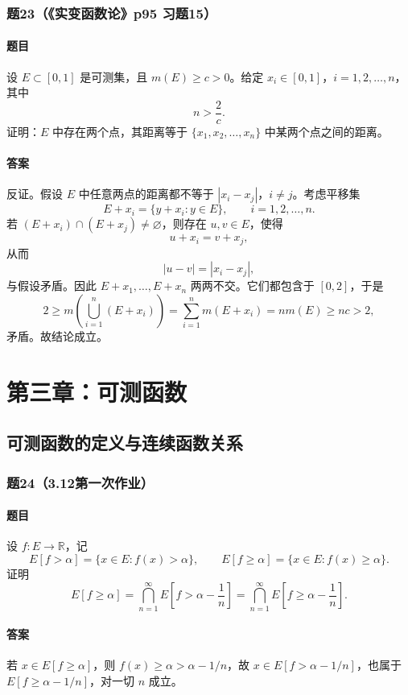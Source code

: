\documentclass{article}
\newcommand{\R}{\mathbb{R}}
\newcommand{\meas}{m}
\begin{document}
	\subsubsection*{题23（《实变函数论》p95 习题15）}
	\paragraph{题目}设 $E\subset[0,1]$ 是可测集，且 $\meas(E)\ge c>0$。给定 $x_i\in[0,1]$，$i=1,2,\ldots,n$，其中
	\[
	n>\frac{2}{c}.
	\]
	证明：$E$ 中存在两个点，其距离等于 $\{x_1,x_2,\ldots,x_n\}$ 中某两个点之间的距离。
	
	\paragraph{答案}反证。假设 $E$ 中任意两点的距离都不等于 $|x_i-x_j|$，$i\ne j$。考虑平移集
	\[
	E+x_i=\{y+x_i:y\in E\},\qquad i=1,2,\ldots,n.
	\]
	若 $(E+x_i)\cap(E+x_j)\ne\varnothing$，则存在 $u,v\in E$，使得
	\[
	u+x_i=v+x_j,
	\]
	从而
	\[
	|u-v|=|x_i-x_j|,
	\]
	与假设矛盾。因此 $E+x_1,\ldots,E+x_n$ 两两不交。它们都包含于 $[0,2]$，于是
	\[
	2\ge \meas\left(\bigcup_{i=1}^{n}(E+x_i)\right)
	=\sum_{i=1}^{n}\meas(E+x_i)=n\meas(E)
	\ge nc>2,
	\]
	矛盾。故结论成立。
	
	\section{第三章：可测函数}
	
	\subsection{可测函数的定义与连续函数关系}
	
	\subsubsection*{题24（3.12第一次作业）}
	\paragraph{题目}设 $f:E\to\R$，记
	\[
	E[f>\alpha]=\{x\in E:f(x)>\alpha\},
	\qquad
	E[f\ge\alpha]=\{x\in E:f(x)\ge\alpha\}.
	\]
	证明
	\[
	E[f\ge\alpha]=\bigcap_{n=1}^{\infty}E\left[f>\alpha-\frac1n\right]
	=\bigcap_{n=1}^{\infty}E\left[f\ge\alpha-\frac1n\right].
	\]
	
	\paragraph{答案}若 $x\in E[f\ge\alpha]$，则 $f(x)\ge\alpha>\alpha-1/n$，故 $x\in E[f>\alpha-1/n]$，也属于 $E[f\ge\alpha-1/n]$，对一切 $n$ 成立。
	
\end{document}
